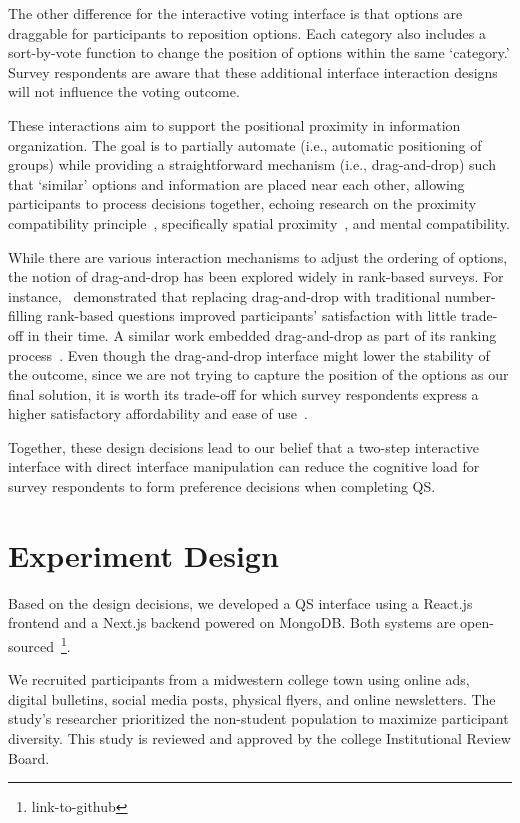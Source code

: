 The other difference for the interactive voting interface is that options are draggable for participants to reposition options. Each category also includes a sort-by-vote function to change the position of options within the same `category.' Survey respondents are aware that these additional interface interaction designs will not influence the voting outcome.

These interactions aim to support the positional proximity in information organization. The goal is to partially automate (i.e., automatic positioning of groups) while providing a straightforward mechanism (i.e., drag-and-drop) such that `similar' options and information are placed near each other, allowing participants to process decisions together, echoing research on the proximity compatibility principle~\cite{wickens1995proximity}, specifically spatial proximity~\cite{wickens1990proximity}, and mental compatibility.

While there are various interaction mechanisms to adjust the ordering of options, the notion of drag-and-drop has been explored widely in rank-based surveys. For instance,~\textcite{krosnick2018measurement} demonstrated that replacing drag-and-drop with traditional number-filling rank-based questions improved participants' satisfaction with little trade-off in their time. A similar work embedded drag-and-drop as part of its ranking process~\cite{timbrook2013comparison}. Even though the drag-and-drop interface might lower the stability of the outcome, since we are not trying to capture the position of the options as our final solution, it is worth its trade-off for which survey respondents express a higher satisfactory affordability and ease of use~\cite{rintoulVisualAnimatedResponse}.

Together, these design decisions lead to our belief that a two-step interactive interface with direct interface manipulation can reduce the cognitive load for survey respondents to form preference decisions when completing QS.

\section{Experiment Design}
\label{sec:experiment}
Based on the design decisions, we developed a QS interface using a React.js frontend and a Next.js backend powered on MongoDB. Both systems are open-sourced~\footnote{link-to-github}.

We recruited participants from a midwestern college town using online ads, digital bulletins, social media posts, physical flyers, and online newsletters. The study's researcher prioritized the non-student population to maximize participant diversity. This study is reviewed and approved by the college Institutional Review Board.

